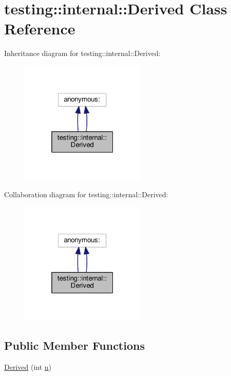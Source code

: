 \hypertarget{classtesting_1_1internal_1_1Derived}{}\section{testing\+:\+:internal\+:\+:Derived Class Reference}
\label{classtesting_1_1internal_1_1Derived}


Inheritance diagram for testing\+:\+:internal\+:\+:Derived\+:
\nopagebreak
\begin{figure}[H]
\begin{center}
\leavevmode
\includegraphics[width=169pt]{classtesting_1_1internal_1_1Derived__inherit__graph}
\end{center}
\end{figure}


Collaboration diagram for testing\+:\+:internal\+:\+:Derived\+:
\nopagebreak
\begin{figure}[H]
\begin{center}
\leavevmode
\includegraphics[width=169pt]{classtesting_1_1internal_1_1Derived__coll__graph}
\end{center}
\end{figure}
\subsection*{Public Member Functions}
\begin{DoxyCompactItemize}
\item 
\hyperlink{classtesting_1_1internal_1_1Derived_a05a8e8354c7c09a9f3728a96c96f1edd}{Derived} (int \hyperlink{app_2main_8cpp_acfc02ec89670db29251fda6a66602ce2}{n})
\end{DoxyCompactItemize}


